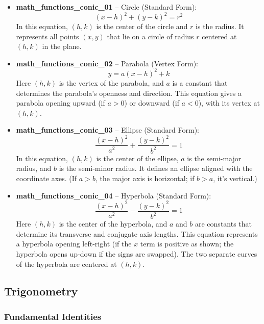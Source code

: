 \documentclass[11pt,a4paper]{article}
\begin{document}
\begin{itemize}
\item \textbf{math\_functions\_conic\_01} -- Circle (Standard Form): 
\[(x - h)^2 + (y - k)^2 = r^2\]
In this equation, $(h, k)$ is the center of the circle and $r$ is the radius. It represents all points $(x, y)$ that lie on a circle of radius $r$ centered at $(h,k)$ in the plane.

\item \textbf{math\_functions\_conic\_02} -- Parabola (Vertex Form): 
\[y = a(x - h)^2 + k\]
Here $(h, k)$ is the vertex of the parabola, and $a$ is a constant that determines the parabola's openness and direction. This equation gives a parabola opening upward (if $a>0$) or downward (if $a<0$), with its vertex at $(h,k)$.

\item \textbf{math\_functions\_conic\_03} -- Ellipse (Standard Form): 
\[\frac{(x - h)^2}{a^2} + \frac{(y - k)^2}{b^2} = 1\]
In this equation, $(h,k)$ is the center of the ellipse, $a$ is the semi-major radius, and $b$ is the semi-minor radius. It defines an ellipse aligned with the coordinate axes. (If $a>b$, the major axis is horizontal; if $b>a$, it's vertical.)

\item \textbf{math\_functions\_conic\_04} -- Hyperbola (Standard Form): 
\[\frac{(x - h)^2}{a^2} - \frac{(y - k)^2}{b^2} = 1\]
Here $(h,k)$ is the center of the hyperbola, and $a$ and $b$ are constants that determine its transverse and conjugate axis lengths. This equation represents a hyperbola opening left-right (if the $x$ term is positive as shown; the hyperbola opens up-down if the signs are swapped). The two separate curves of the hyperbola are centered at $(h,k)$.
\end{itemize}

\subsection{Trigonometry}

\subsubsection{Fundamental Identities}
\end{document}
